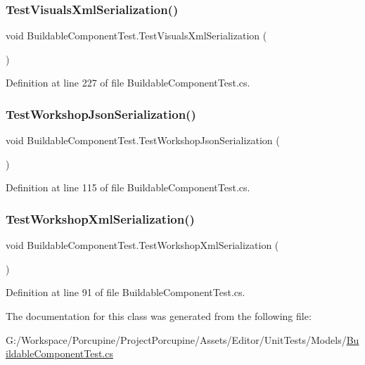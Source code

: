 \subsubsection{\texorpdfstring{Test\+Visuals\+Xml\+Serialization()}{TestVisualsXmlSerialization()}}
{\footnotesize\ttfamily void Buildable\+Component\+Test.\+Test\+Visuals\+Xml\+Serialization (\begin{DoxyParamCaption}{ }\end{DoxyParamCaption})}



Definition at line 227 of file Buildable\+Component\+Test.\+cs.

\mbox{\label{class_buildable_component_test_a14dee679cc597bb265b64938cb2fb2e0}} 
\subsubsection{\texorpdfstring{Test\+Workshop\+Json\+Serialization()}{TestWorkshopJsonSerialization()}}
{\footnotesize\ttfamily void Buildable\+Component\+Test.\+Test\+Workshop\+Json\+Serialization (\begin{DoxyParamCaption}{ }\end{DoxyParamCaption})}



Definition at line 115 of file Buildable\+Component\+Test.\+cs.

\mbox{\label{class_buildable_component_test_addeafb31ae34b0eee14f6ea89b834b89}} 
\subsubsection{\texorpdfstring{Test\+Workshop\+Xml\+Serialization()}{TestWorkshopXmlSerialization()}}
{\footnotesize\ttfamily void Buildable\+Component\+Test.\+Test\+Workshop\+Xml\+Serialization (\begin{DoxyParamCaption}{ }\end{DoxyParamCaption})}



Definition at line 91 of file Buildable\+Component\+Test.\+cs.



The documentation for this class was generated from the following file\+:\begin{DoxyCompactItemize}
\item 
G\+:/\+Workspace/\+Porcupine/\+Project\+Porcupine/\+Assets/\+Editor/\+Unit\+Tests/\+Models/\hyperlink{_buildable_component_test_8cs}{Buildable\+Component\+Test.\+cs}\end{DoxyCompactItemize}
